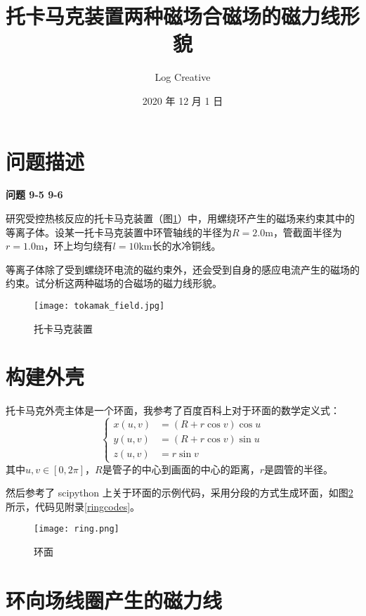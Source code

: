 \documentclass[a4paper,12pt]{article}
\begin{document}
\begin{CJK}{UTF8}{gbsn}  %
\title{托卡马克装置两种磁场合磁场的磁力线形貌}
\author{Log Creative}
\date{2020 年 12 月 1 日}
\maketitle
\normalsize

\section{问题描述}

\textbf{问题 9-5 9-6}

研究受控热核反应的托卡马克装置（图\ref{toka}）中，用螺绕环产生的磁场来约束其中的等离子体。设某一托卡马克装置中环管轴线的半径为$R=2.0\text{m}$，管截面半径为$r=1.0\text{m}$，环上均匀绕有$l=10\text{km}$长的水冷铜线。

等离子体除了受到螺绕环电流的磁约束外，还会受到自身的感应电流产生的磁场的约束。试分析这两种磁场的合磁场的磁力线形貌。

\begin{figure}[H]
    \centering
    \texttt{[image: tokamak\_field.jpg]}
    \caption{托卡马克装置\cite{Li2014}}
    \label{toka}
\end{figure}

\section{构建外壳}

托卡马克外壳主体是一个环面，我参考了百度百科\cite{ring}上对于环面的数学定义式：
$$
    \begin{cases}
        x(u,v) &= (R+r\cos v)\cos u \\
        y(u,v) &= (R+r\cos v)\sin u \\
        z(u,v) &= r\sin v
    \end{cases}
$$
其中$u,v\in[0,2\pi]$，$R$是管子的中心到画面的中心的距离，$r$是圆管的半径。

然后参考了 scipython 上关于环面的示例代码\cite{ringcode}，采用分段的方式生成环面，如图\ref{ring}所示，代码见附录\ref{ringcodes}。

\begin{figure}[H]
    \centering
    \texttt{[image: ring.png]}
    \caption{环面}\label{ring}
\end{figure}

\section{环向场线圈产生的磁力线}


\end{CJK}
\end{document}
